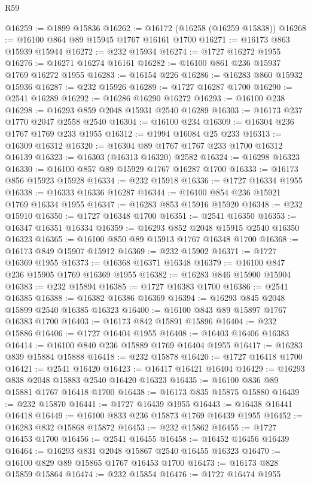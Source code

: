 \begin{lexlean}{R59}
\begin{coremodule}
@16259 := @1899 @15836
@16262 := @16172 (@16258 (@16259 @15838))
@16268 := @16100 @864 @89 @15945 @1767 @16161 @1700
@16271 := @16173 @863 @15939 @15944
@16272 := @232 @15934
@16274 := @1727 @16272 @1955
@16276 := @16271 @16274 @16161
@16282 := @16100 @861 @236 @15937 @1769 @16272 @1955
@16283 := @16154 @226
@16286 := @16283 @860 @15932 @15936
@16287 := @232 @15926
@16289 := @1727 @16287 @1700
@16290 := @2541 @16289
@16292 := @16286 @16290 @16272
@16293 := @16100 @238
@16298 := @16293 @859 @2048 @15931 @2540 @16289
@16303 := @16173 @237 @1770 @2047 @2558 @2540
@16304 := @16100 @234
@16309 := @16304 @236 @1767 @1769 @233 @1955
@16312 := @1994 @16084 @25 @233
@16313 := @16309 @16312
@16320 := @16304 @89 @1767 @1767 @233 @1700 @16312 @16139
@16323 := @16303 (@16313 @16320) @2582
@16324 := @16298 @16323
@16330 := @16100 @857 @89 @15929 @1767 @16287 @1700
@16333 := @16173 @856 @15923 @15928
@16334 := @232 @15918
@16336 := @1727 @16334 @1955
@16338 := @16333 @16336 @16287
@16344 := @16100 @854 @236 @15921 @1769 @16334 @1955
@16347 := @16283 @853 @15916 @15920
@16348 := @232 @15910
@16350 := @1727 @16348 @1700
@16351 := @2541 @16350
@16353 := @16347 @16351 @16334
@16359 := @16293 @852 @2048 @15915 @2540 @16350 @16323
@16365 := @16100 @850 @89 @15913 @1767 @16348 @1700
@16368 := @16173 @849 @15907 @15912
@16369 := @232 @15902
@16371 := @1727 @16369 @1955
@16373 := @16368 @16371 @16348
@16379 := @16100 @847 @236 @15905 @1769 @16369 @1955
@16382 := @16283 @846 @15900 @15904
@16383 := @232 @15894
@16385 := @1727 @16383 @1700
@16386 := @2541 @16385
@16388 := @16382 @16386 @16369
@16394 := @16293 @845 @2048 @15899 @2540 @16385 @16323
@16400 := @16100 @843 @89 @15897 @1767 @16383 @1700
@16403 := @16173 @842 @15891 @15896
@16404 := @232 @15886
@16406 := @1727 @16404 @1955
@16408 := @16403 @16406 @16383
@16414 := @16100 @840 @236 @15889 @1769 @16404 @1955
@16417 := @16283 @839 @15884 @15888
@16418 := @232 @15878
@16420 := @1727 @16418 @1700
@16421 := @2541 @16420
@16423 := @16417 @16421 @16404
@16429 := @16293 @838 @2048 @15883 @2540 @16420 @16323
@16435 := @16100 @836 @89 @15881 @1767 @16418 @1700
@16438 := @16173 @835 @15875 @15880
@16439 := @232 @15870
@16441 := @1727 @16439 @1955
@16443 := @16438 @16441 @16418
@16449 := @16100 @833 @236 @15873 @1769 @16439 @1955
@16452 := @16283 @832 @15868 @15872
@16453 := @232 @15862
@16455 := @1727 @16453 @1700
@16456 := @2541 @16455
@16458 := @16452 @16456 @16439
@16464 := @16293 @831 @2048 @15867 @2540 @16455 @16323
@16470 := @16100 @829 @89 @15865 @1767 @16453 @1700
@16473 := @16173 @828 @15859 @15864
@16474 := @232 @15854
@16476 := @1727 @16474 @1955

\end{coremodule}
\end{lexlean}

